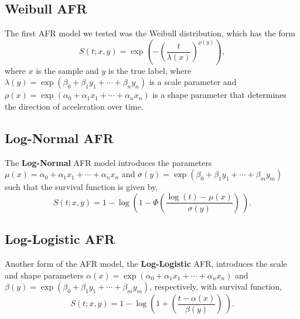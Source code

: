 \subsection{Weibull AFR}
The first AFR model we tested was the Weibull distribution, which has the form
\[
    S(t; x, y) = \exp{\left( - \left( \frac{t}{\lambda(x)} \right)^{\rho(y)} \right)},
\]
where $x$ is the sample and $y$ is the true label, where $\lambda(y)=\exp(\beta_0 + \beta_1 y_1 + \cdots + \beta_n y_n)$ is a scale parameter and $\rho(x)=\exp(\alpha_0 + \alpha_1 x_1 + \cdots + \alpha_n x_n)$ is a shape parameter that determines the direction of acceleration over time.


\subsection{Log-Normal AFR}

The \textbf{Log-Normal} AFR model introduces the parameters $\mu(x) = \alpha_0 + \alpha_1 x_1 + \cdots + \alpha_n x_n $ and $\sigma(y) = \exp(\beta_0 + \beta_1 y_1 + \cdots + \beta_m y_m)$ such that the survival function is given by,
\[
    S(t; x, y) = 1 - \log \left( 1 - \Phi \left (  \frac{\log(t) - \mu(x) }{ \sigma(y) } \right ) \ \right).
\]
\subsection{Log-Logistic AFR}
Another form of the AFR model, the \textbf{Log-Logistic} AFR, introduces the scale and shape parameters $\alpha(x) = \exp(\alpha_0 + \alpha_1 x_1 + \cdots + \alpha_n x_n )$ and $\beta(y) = \exp(\beta_0 + \beta_1 y_1 + \cdots + \beta_m y_m)$, respectively, with survival function,
\[
    S(t; x, y) = 1 - \log \left( 1 + \left (  \frac{t - \alpha(x) }{ \beta(y) } \right ) \ \right).
\]

